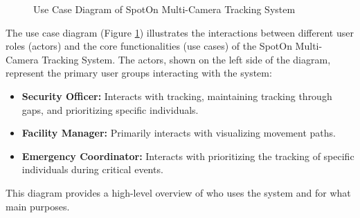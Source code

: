 \begin{figure}[h!]
    \centering
    \caption{Use Case Diagram of SpotOn Multi-Camera Tracking System}
    \label{fig:use-case-diagram}
\end{figure}
\clearpage
The use case diagram (Figure \ref{fig:use-case-diagram}) illustrates the interactions between different user roles (actors) and the core functionalities (use cases) of the SpotOn Multi-Camera Tracking System. The actors, shown on the left side of the diagram, represent the primary user groups interacting with the system:

\begin{itemize}
    \item \textbf{Security Officer:} Interacts with tracking, maintaining tracking through gaps, and prioritizing specific individuals.
    \item \textbf{Facility Manager:} Primarily interacts with visualizing movement paths.
    \item \textbf{Emergency Coordinator:} Interacts with prioritizing the tracking of specific individuals during critical events.
\end{itemize}
This diagram provides a high-level overview of who uses the system and for what main purposes.

